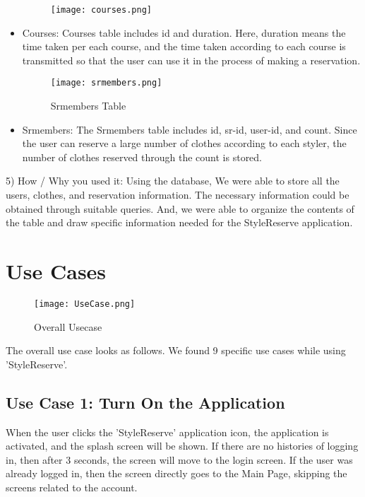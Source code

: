 \documentclass[conference]{IEEEtran}
\begin{document}
\begin{itemize}
    \begin{figure}[htbp]
    \centerline{\texttt{[image: courses.png]}}
    \label{fig}
    \end{figure}
    \item Courses: Courses table includes id and duration. Here, duration means the time taken per each course, and the time taken according to each course is transmitted so that the user can use it in the process of making a reservation.\\
    
    \begin{figure}[htbp]
    \centerline{\texttt{[image: srmembers.png]}}
    \label{fig}
    \caption{Srmembers Table}
    \end{figure}
    \item Srmembers: The Srmembers table includes id, sr-id, user-id, and count. Since the user can reserve a large number of clothes according to each styler, the number of clothes reserved through the count is stored.\\
\end{itemize}

5) How / Why you used it: Using the database, We were able to store all the users, clothes, and reservation information. The necessary information could be obtained through suitable queries. And, we were able to organize the contents of the table and draw specific information needed for the StyleReserve application.\\

\section{Use Cases}
\begin{figure}[htbp]
\centerline{\texttt{[image: UseCase.png]}}
\label{fig}
\caption{Overall Usecase}
\end{figure}
The overall use case looks as follows. We found 9 specific use cases while using 'StyleReserve'.\\

\subsection{Use Case 1: Turn On the Application}
When the user clicks the 'StyleReserve' application icon, the application is activated, and the splash screen will be shown. If there are no histories of logging in, then after 3 seconds, the screen will move to the login screen. If the user was already logged in, then the screen directly goes to the Main Page, skipping the screens related to the account.\\
    
\end{document}
